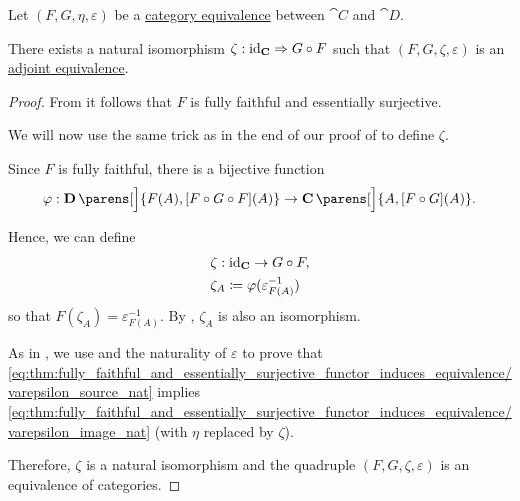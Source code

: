 \begin{proposition}\label{thm:adjoint_equivalence}
  Let \( (F, G, \eta, \varepsilon) \) be a \hyperref[def:category_equivalence]{category equivalence} between \( \cat{C} \) and \( \cat{D} \).

  There exists a natural isomorphism \( \zeta: \id_{\cat{C}} \Rightarrow G \bincirc F \) such that \( (F, G, \zeta, \varepsilon) \) is an \hyperref[def:adjoint_equivalence]{adjoint equivalence}.
\end{proposition}
\begin{proof}
  From  it follows that \( F \) is fully faithful and essentially surjective.

  We will now use the same trick as in the end of our proof of  to define \( \zeta \).

  Since \( F \) is fully faithful, there is a bijective function
  \begin{equation*}
    \varphi: \cat{D}\parens[\Big]{ F(A), [F \bincirc G \bincirc F](A) } \to \cat{C}\parens[\Big]{ A, [F \bincirc G](A) }.
  \end{equation*}

  Hence, we can define
  \begin{equation*}
    \begin{aligned}
      &\zeta: \id_{\cat{C}} \to G \bincirc F, \\
      &\zeta_A \coloneqq \varphi(\varepsilon_{F(A)}^{-1})
    \end{aligned}
  \end{equation*}
  so that \( F(\zeta_A) = \varepsilon_{F(A)}^{-1} \). By , \( \zeta_A \) is also an isomorphism.

  As in , we use  and the naturality of \( \varepsilon \) to prove that \eqref{eq:thm:fully_faithful_and_essentially_surjective_functor_induces_equivalence/varepsilon_source_nat} implies \eqref{eq:thm:fully_faithful_and_essentially_surjective_functor_induces_equivalence/varepsilon_image_nat} (with \( \eta \) replaced by \( \zeta \)).

  Therefore, \( \zeta \) is a natural isomorphism and the quadruple \( (F, G, \zeta, \varepsilon) \) is an equivalence of categories.
\end{proof}

